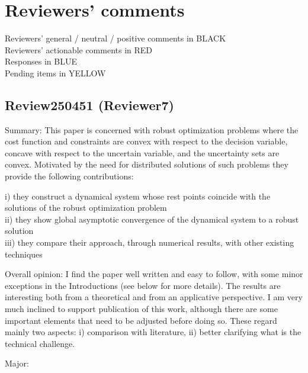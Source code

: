 \documentclass[journal,twoside,web]{ieeecolor}
\begin{document}
\newpage
\onecolumn
\section{Reviewers' comments}
\noindent Reviewers' general / neutral / positive comments in {\color{black}BLACK}\\
Reviewers' actionable comments in RED\\
Responses in {\color{blue}BLUE}\\
Pending items in YELLOW\\

\subsection{Review250451 (Reviewer7)}

Summary:
This paper is concerned with robust optimization problems where the cost function and constraints are convex with respect to the decision variable, concave with respect to the uncertain variable, and the uncertainty sets are convex. Motivated by the need for distributed solutions of such problems they provide the following contributions:

i) they construct a dynamical system whose rest points coincide with the solutions of the robust optimization problem\\
ii) they show global asymptotic convergence of the dynamical system to a robust solution\\
iii) they compare their approach, through numerical results, with other existing techniques

Overall opinion:
I find the paper well written and easy to follow, with some minor exceptions in the Introductions (see below for more details). The results are interesting both from a theoretical and from an applicative perspective. I am very much inclined to support publication of this work, although there are some important elements that need to be adjusted before doing so. These regard mainly two aspects: i) comparison with literature, ii) better clarifying what is the technical challenge.

Major:
\end{document}
